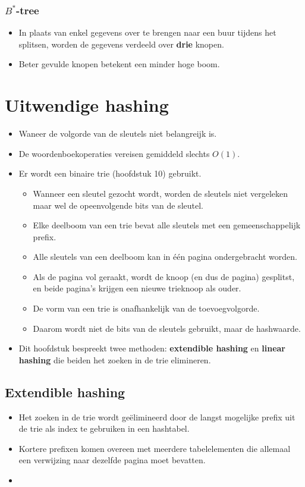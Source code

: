 \subsubsection{$B^*$-tree}
\begin{itemize}
    \item In plaats van enkel gegevens over te brengen naar een buur tijdens het splitsen, worden de gegevens verdeeld over \textbf{drie} knopen.
    \item Beter gevulde knopen betekent een minder hoge boom.
\end{itemize}
\section{Uitwendige hashing}
\begin{itemize}
    \item Waneer de volgorde van de sleutels niet belangreijk is.
    \item De woordenboekoperaties vereisen gemiddeld slechts $O(1)$.
    \item Er wordt een binaire trie (hoofdstuk 10) gebruikt.
    \begin{itemize}
        \item Wanneer een sleutel gezocht wordt, worden de sleutels niet vergeleken maar wel de opeenvolgende bits van de sleutel.
        \item Elke deelboom van een trie bevat alle sleutels met een gemeenschappelijk prefix.
        \item Alle sleutels van een deelboom kan in één pagina ondergebracht worden.
        \item Als de pagina vol geraakt, wordt de knoop (en dus de pagina) gesplitst, en beide pagina's krijgen een nieuwe trieknoop als ouder.
        \item De vorm van een trie is onafhankelijk van de toevoegvolgorde.
        \item Daarom wordt niet de bits van de sleutels gebruikt, maar de hashwaarde.
    \end{itemize}
    \item Dit hoofdstuk bespreekt twee methoden: \textbf{extendible hashing} en \textbf{linear hashing} die beiden het zoeken in de trie elimineren.

\end{itemize}

\subsection{Extendible hashing}
\begin{itemize}
    \item Het zoeken in de trie wordt geëlimineerd door de langst mogelijke prefix uit de trie als index te gebruiken in een hashtabel.
    \item Kortere prefixen komen overeen met meerdere tabelelementen die allemaal een verwijzing naar dezelfde pagina moet bevatten.
    \item 
\end{itemize}

